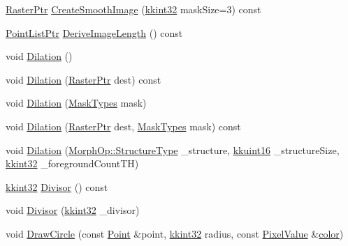 \begin{DoxyCompactItemize}
\item 
\hyperlink{class_k_k_b_1_1_raster_aefa532857fd6aa9eb53f79da55a97c5a}{Raster\+Ptr} \hyperlink{class_k_k_b_1_1_raster_a7cc2985980e4679bd1ce1283da0bd9a3}{Create\+Smooth\+Image} (\hyperlink{namespace_k_k_b_a8fa4952cc84fda1de4bec1fbdd8d5b1b}{kkint32} mask\+Size=3) const 
\item 
\hyperlink{namespace_k_k_b_ad6b8056511ec9a218dd5ef30b57d1415}{Point\+List\+Ptr} \hyperlink{class_k_k_b_1_1_raster_aa062339510c35f16df15b8d803e20b02}{Derive\+Image\+Length} () const 
\item 
void \hyperlink{class_k_k_b_1_1_raster_afb263b7cc4ab60bf6745c5166173bbb9}{Dilation} ()
\item 
void \hyperlink{class_k_k_b_1_1_raster_a0611d08df2ec9c3ba78b6d8f221b407f}{Dilation} (\hyperlink{class_k_k_b_1_1_raster_aefa532857fd6aa9eb53f79da55a97c5a}{Raster\+Ptr} dest) const 
\item 
void \hyperlink{class_k_k_b_1_1_raster_a7171dd6394e04a8585790231e09737a2}{Dilation} (\hyperlink{class_k_k_b_1_1_morph_op_a9eaa0383bf9e046da208af397e7e35eb}{Mask\+Types} mask)
\item 
void \hyperlink{class_k_k_b_1_1_raster_a9db1b47039b2eeea6dc55d2812ca79db}{Dilation} (\hyperlink{class_k_k_b_1_1_raster_aefa532857fd6aa9eb53f79da55a97c5a}{Raster\+Ptr} dest, \hyperlink{class_k_k_b_1_1_morph_op_a9eaa0383bf9e046da208af397e7e35eb}{Mask\+Types} mask) const 
\item 
void \hyperlink{class_k_k_b_1_1_raster_a85c8038b1c4ba67cc609ecec37fa6e88}{Dilation} (\hyperlink{class_k_k_b_1_1_morph_op_a09e4aff7e81327849855ff72082d85b3}{Morph\+Op\+::\+Structure\+Type} \+\_\+structure, \hyperlink{namespace_k_k_b_aa8c7d4d30381c8a0b6fce68974a9c8a9}{kkuint16} \+\_\+structure\+Size, \hyperlink{namespace_k_k_b_a8fa4952cc84fda1de4bec1fbdd8d5b1b}{kkint32} \+\_\+foreground\+Count\+TH)
\item 
\hyperlink{namespace_k_k_b_a8fa4952cc84fda1de4bec1fbdd8d5b1b}{kkint32} \hyperlink{class_k_k_b_1_1_raster_a6a5e1b533d8455653b32215094b70179}{Divisor} () const 
\item 
void \hyperlink{class_k_k_b_1_1_raster_a13531b0af4388acd010ed80e71c12d30}{Divisor} (\hyperlink{namespace_k_k_b_a8fa4952cc84fda1de4bec1fbdd8d5b1b}{kkint32} \+\_\+divisor)
\item 
void \hyperlink{class_k_k_b_1_1_raster_a21fa17339fe0c963d0cf7af374255cd0}{Draw\+Circle} (const \hyperlink{class_k_k_b_1_1_point}{Point} \&point, \hyperlink{namespace_k_k_b_a8fa4952cc84fda1de4bec1fbdd8d5b1b}{kkint32} radius, const \hyperlink{class_k_k_b_1_1_pixel_value}{Pixel\+Value} \&\hyperlink{class_k_k_b_1_1_raster_a482384d89cc53fa4f36276307c746854}{color})

\end{DoxyCompactItemize}
